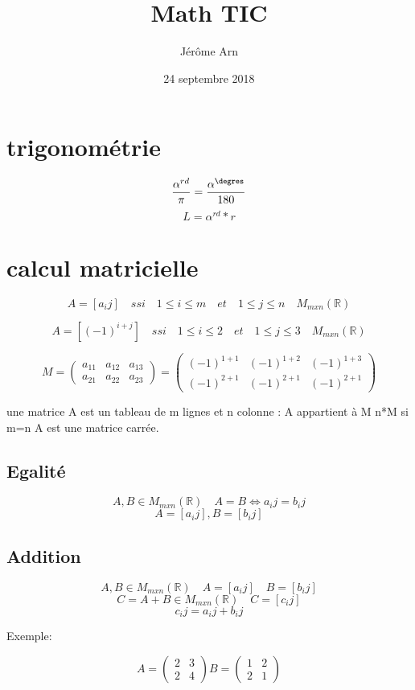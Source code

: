 \documentclass{article}
\title{Math TIC}
\author{Jérôme Arn}
\date{24 septembre 2018}
\begin{document}
\maketitle
\newpage

\tableofcontents
\newpage

\section{trigonométrie}

\[\frac{\alpha^{rd}}{\pi} = \frac{\alpha^{\degres}}{180}\]
$$ L = \alpha^{rd}*r$$

\section{calcul matricielle}
\[A=[a_ij] \quad ssi \quad 1 \leqslant i \leqslant m \quad et \quad  1 \leqslant j \leqslant n \quad M_{mxn}(\mathbb{R})\]

\[A=[(-1)^{i+j}] \quad ssi \quad 1 \leqslant i \leqslant 2 \quad et \quad  1 \leqslant j \leqslant 3 \quad M_{mxn}(\mathbb{R})\]

\[
M=
  \begin{pmatrix}
    a_11 & a_12 & a_13  \\
    a_21 & a_22 & a_23
  \end{pmatrix}
  =
  \begin{pmatrix}
    (-1)^{1+1} & (-1)^{1+2} & (-1)^{1+3}  \\
    (-1)^{2+1} & (-1)^{2+1} & (-1)^{2+1}
  \end{pmatrix}
\]


une matrice A est un tableau de m lignes et n colonne : A appartient à M n*M
si m=n A est une matrice carrée. 

\subsection{Egalité}
\[A,B \in M_{mxn}(\mathbb{R}) \quad A = B \Longleftrightarrow a_ij = b_ij\]
\[A = [a_ij], B = [b_ij]\]

\subsection{Addition}
\[A,B \in M_{mxn}(\mathbb{R}) \quad A = [a_ij] \quad B = [b_ij]\]
\[C = A + B \in M_{mxn}(\mathbb{R}) \quad C = [c_ij]\]
\[c_ij = a_ij + b_ij\]

Exemple:

\[
A=
  \begin{pmatrix}
    2 & 3 \\
    2 & 4
  \end{pmatrix}
B =
  \begin{pmatrix}
    1 & 2  \\
    2 & 1
  \end{pmatrix}
\]
\end{document}
